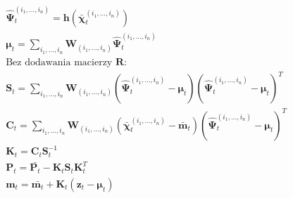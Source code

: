\begin{itemize}
\begin{align}
	&\hat{\boldsymbol{\Psi}}^{(i_1, \dots, i_n)}_{t} = \boldsymbol{h}(\bar{\boldsymbol{\chi}}^{(i_1, \dots, i_n)}_{t}) \nonumber \\
	&\boldsymbol{\mu}_t=\sum_{i_1,\dots,i_n} \boldsymbol{W}_{(i_1, \dots, i_n)} \hat{\boldsymbol{\Psi}}^{(i_1, \dots, i_n)}_{t} \nonumber \\
	&\text{Bez dodawania macierzy $\boldsymbol{R}$:} \nonumber \\
	&\boldsymbol{S}_t=\sum_{i_1,\dots,i_n} \boldsymbol{W}_{(i_1, \dots, i_n)}(\hat{\boldsymbol{\Psi}}^{(i_1, \dots, i_n)}_{t} - \boldsymbol{\mu}_t)(\hat{\boldsymbol{\Psi}}^{(i_1, \dots, i_n)}_{t} - \boldsymbol{\mu}_t)^T \nonumber \\
	&\boldsymbol{C}_t = \sum_{i_1,\dots,i_n} \boldsymbol{W}_{(i_1, \dots, i_n)} (\bar{\boldsymbol{\chi}}^{(i_1, \dots, i_n)}_{t} - \bar{\boldsymbol{m}}_t)(\hat{\boldsymbol{\Psi}}^{(i_1, \dots, i_n)}_{t} - \boldsymbol{\mu}_t)^T \nonumber \\
	&\boldsymbol{K}_t=\boldsymbol{C}_t\boldsymbol{S}_t^{-1} \nonumber \\
	&\boldsymbol{P}_t=\bar{\mathbf{P}_{t}} - \boldsymbol{K}_t\boldsymbol{S}_t\boldsymbol{K}_t^T \nonumber \\
	&\boldsymbol{m}_t = \bar{\boldsymbol{m}_t} + \boldsymbol{K}_t(\boldsymbol{z}_t - \boldsymbol{\mu}_t)
	\end{align}
\end{itemize}